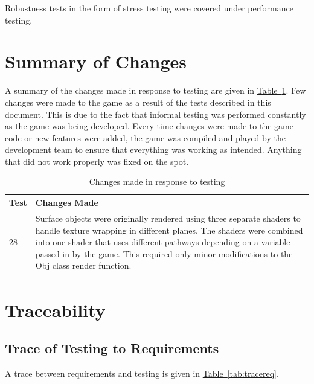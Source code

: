 \documentclass[12pt, titlepage]{article}
\begin{document}
Robustness tests in the form of stress testing were covered under performance testing.

\section{Summary of Changes}
A summary of the changes made in response to testing are given in \hyperref[tab:changes]{Table~\ref*{tab:changes}}.  Few changes were made to the game as a result of the tests described in this document.  This is due to the fact that informal testing was performed constantly as the game was being developed.  Every time changes were made to the game code or new features were added, the game was compiled and played by the development team to ensure that everything was working as intended.  Anything that did not work properly was fixed on the spot.

\begin{table}[ht]
\caption{Changes made in response to testing} \label{tab:changes}
\begin{tabularx}{\textwidth}{p{5cm}X}
\toprule {\bf Test} & {\bf Changes Made}\\
\midrule
28 & Surface objects were originally rendered using three separate shaders to handle texture wrapping in different planes.  The shaders were combined into one shader that uses different pathways depending on a variable passed in by the game.  This required only minor modifications to the Obj class render function.\\
\bottomrule
\end{tabularx}
\end{table}

\section{Traceability}
\subsection{Trace of Testing to Requirements}
A trace between requirements and testing is given in \hyperref[tab:tracereq]{Table~\ref*{tab:tracereq}}.\\
\end{document}
